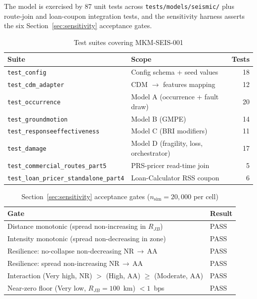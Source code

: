 
The model is exercised by 87 unit tests across \texttt{tests/models/seismic/}
plus route-join and loan-coupon integration tests, and the sensitivity harness
asserts the six Section~\ref{sec:sensitivity} acceptance gates.

\begin{table}[H]
  \centering
  \caption{Test suites covering MKM-SEIS-001}
  \begin{tabular}{llr}
    \toprule
    \textbf{Suite} & \textbf{Scope} & \textbf{Tests} \\
    \midrule
    \texttt{test\_config}                & Config schema + seed values & 18 \\
    \texttt{test\_cdm\_adapter}          & CDM $\rightarrow$ features mapping & 12 \\
    \texttt{test\_occurrence}            & Model A (occurrence + fault draw) & 20 \\
    \texttt{test\_groundmotion}          & Model B (GMPE) & 14 \\
    \texttt{test\_responseeffectiveness} & Model C (BRI modifiers) & 11 \\
    \texttt{test\_damage}                & Model D (fragility, loss, orchestrator) & 17 \\
    \midrule
    \texttt{test\_commercial\_routes\_part5} & PRS-pricer read-time join & 5 \\
    \texttt{test\_loan\_pricer\_standalone\_part4} & Loan-Calculator RSS coupon & 6 \\
    \bottomrule
  \end{tabular}
\end{table}

\begin{table}[H]
  \centering
  \caption{Section~\ref{sec:sensitivity} acceptance gates ($n_{\text{sim}} = 20{,}000$ per cell)}
  \begin{tabular}{ll}
    \toprule
    \textbf{Gate} & \textbf{Result} \\
    \midrule
    Distance monotonic (spread non-increasing in $R_{JB}$)      & PASS \\
    Intensity monotonic (spread non-decreasing in zone)         & PASS \\
    Resilience: no-collapse non-decreasing NR\,$\rightarrow$\,AA & PASS \\
    Resilience: spread non-increasing NR\,$\rightarrow$\,AA      & PASS \\
    Interaction (Very high, NR) $>$ (High, AA) $\ge$ (Moderate, AA) & PASS \\
    Near-zero floor (Very low, $R_{JB} = 100$~km) $< 1$~bps      & PASS \\
    \bottomrule
  \end{tabular}
\end{table}
